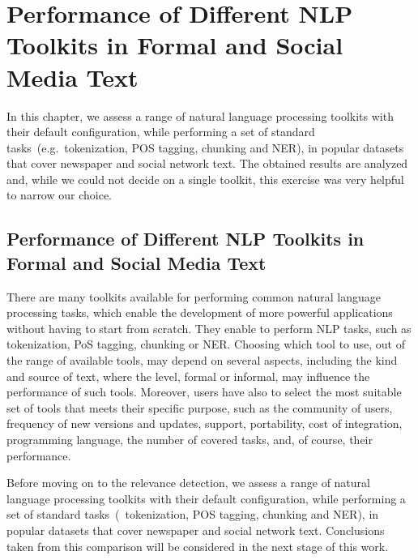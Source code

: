
\chapter{Performance of Different NLP Toolkits in Formal and Social Media Text} %

\label{Chapter4} %

In this chapter, we assess a range of natural language processing toolkits with their default configuration, while performing a set of standard tasks~(e.g.~tokenization, POS tagging, chunking and NER), in popular datasets that cover newspaper and social network text.
The obtained results are analyzed and, while we could not decide on a single toolkit, this exercise was very helpful to narrow our choice.

\section*{Performance of Different NLP Toolkits in Formal and Social Media Text}
There are many toolkits available for performing common natural language processing tasks, which enable the development of more powerful applications without having to start from scratch.
They enable to perform NLP tasks, such as tokenization, PoS tagging, chunking or NER.
Choosing which tool to use, out of the range of available tools, may depend on several aspects, including the kind and source of text, where the level, formal or informal, may influence the performance of such tools. Moreover, users have also to select the most suitable set of tools that meets their specific purpose, such as the community of users, frequency of new versions and updates, support, portability, cost of integration, programming language, the number of covered tasks, and, of course, their performance.

Before moving on to the relevance detection, we assess a range of natural language processing toolkits with their default configuration, while performing a set of standard tasks~(~tokenization, POS tagging, chunking and NER), in popular datasets that cover newspaper and social network text. Conclusions taken from this comparison will be considered in the next stage of this work.

